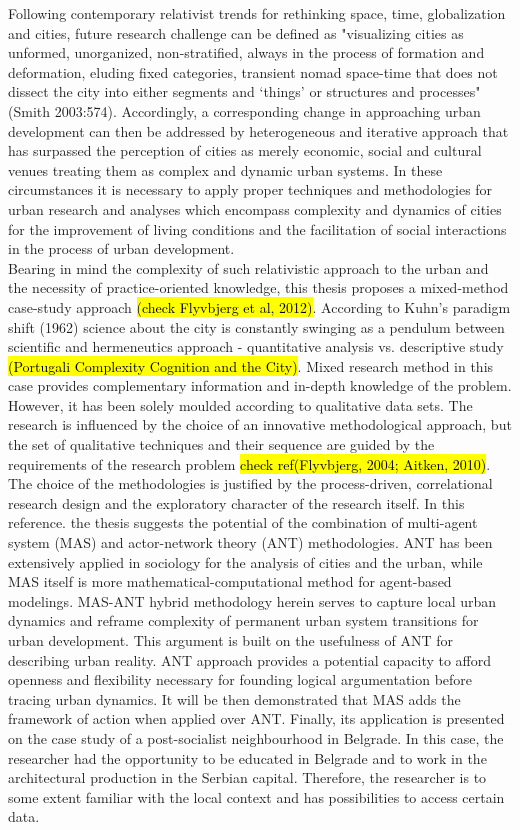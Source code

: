 \documentclass[11pt]{report}
\begin{document}
Following contemporary relativist trends for rethinking space, time, globalization and cities, future research challenge can be defined as "visualizing cities as unformed, unorganized, non-stratified, always in the process of formation and deformation, eluding fixed categories, transient nomad space-time that does not dissect the city into either segments and ‘things’ or structures and processes" (Smith 2003:574). Accordingly, a corresponding change in approaching urban development can then be addressed by heterogeneous and iterative approach that has surpassed the perception of cities as merely economic, social and cultural venues treating them as complex and dynamic urban systems. In these circumstances it is necessary to apply proper techniques and methodologies for urban research and analyses which encompass complexity and dynamics of cities for the improvement of living conditions and the facilitation of social interactions in the process of urban development. 
\\
Bearing in mind the complexity of such relativistic approach to the urban and the necessity of practice-oriented knowledge, this thesis proposes a mixed-method case-study approach \hl{(check Flyvbjerg et al, 2012)}. According to Kuhn's paradigm shift (1962) science about the city is constantly swinging as a pendulum between scientific and hermeneutics approach - quantitative analysis vs. descriptive study \hl{(Portugali Complexity Cognition and the City)}. Mixed research method in this case provides complementary information and in-depth knowledge of the problem. However, it has been solely moulded according to qualitative data sets. The research is influenced by the choice of an innovative methodological approach,  but  the  set of qualitative techniques  and  their  sequence  are  guided by the requirements of the research problem \hl{check ref(Flyvbjerg, 2004; Aitken, 2010)}.
\\
The choice of the methodologies is justified by the process-driven, correlational research design and the exploratory character of the research itself. In this reference. the thesis suggests the potential of the combination of multi-agent system (MAS) and actor-network theory (ANT) methodologies. ANT has been extensively applied in sociology for the analysis of cities and the urban, while MAS itself is more mathematical-computational method for agent-based modelings. MAS-ANT hybrid methodology  herein serves to capture local urban dynamics and reframe complexity of permanent urban system transitions for urban development. This argument is built on the usefulness of ANT for describing urban reality. ANT approach provides a potential capacity to afford openness and flexibility necessary for founding logical argumentation before tracing urban dynamics. It will be then demonstrated that MAS adds the framework of action when applied over ANT. Finally, its application is presented on the case study of a post-socialist neighbourhood in Belgrade. In this case, the researcher had the opportunity to be educated in Belgrade and to work in the architectural production in the Serbian capital. Therefore, the  researcher is  to  some  extent  familiar  with  the  local  context  and has possibilities to access certain data.
\end{document}
